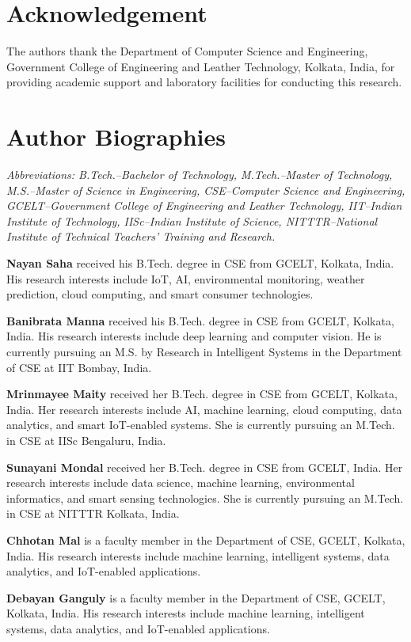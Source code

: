 \documentclass[conference]{IEEEtran}
\begin{document}
\section*{Acknowledgement}

The authors thank the Department of Computer Science and Engineering, Government College of Engineering and Leather Technology, Kolkata, India, for providing academic support and laboratory facilities for conducting this research.

\section*{Author Biographies}

\noindent\textit{Abbreviations: B.Tech.--Bachelor of Technology, M.Tech.--Master of Technology, M.S.--Master of Science in Engineering, CSE--Computer Science and Engineering, GCELT--Government College of Engineering and Leather Technology, IIT--Indian Institute of Technology, IISc--Indian Institute of Science, NITTTR--National Institute of Technical Teachers' Training and Research.}

\vspace{0.5em}

\textbf{Nayan Saha} received his B.Tech. degree in CSE from GCELT, Kolkata, India. His research interests include IoT, AI, environmental monitoring, weather prediction, cloud computing, and smart consumer technologies.

\vspace{0.5em}

\textbf{Banibrata Manna} received his B.Tech. degree in CSE from GCELT, Kolkata, India. His research interests include deep learning and computer vision. He is currently pursuing an M.S. by Research in Intelligent Systems in the Department of CSE at IIT Bombay, India.

\vspace{0.5em}

\textbf{Mrinmayee Maity} received her B.Tech. degree in CSE from GCELT, Kolkata, India. Her research interests include AI, machine learning, cloud computing, data analytics, and smart IoT-enabled systems. She is currently pursuing an M.Tech. in CSE at IISc Bengaluru, India.

\vspace{0.5em}

\textbf{Sunayani Mondal} received her B.Tech. degree in CSE from GCELT, India. Her research interests include data science, machine learning, environmental informatics, and smart sensing technologies. She is currently pursuing an M.Tech. in CSE at NITTTR Kolkata, India.

\vspace{0.5em}

\textbf{Chhotan Mal} is a faculty member in the Department of CSE, GCELT, Kolkata, India. His research interests include machine learning, intelligent systems, data analytics, and IoT-enabled applications.

\vspace{0.5em}

\textbf{Debayan Ganguly} is a faculty member in the Department of CSE, GCELT, Kolkata, India. His research interests include machine learning, intelligent systems, data analytics, and IoT-enabled applications.
\end{document}
